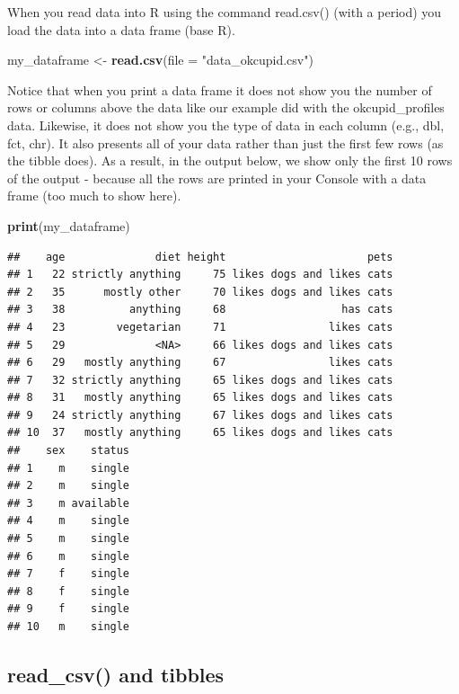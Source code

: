 \documentclass[
]{krantz}
\makeatletter
\newenvironment{Shaded}{\begin{snugshade}}{\end{snugshade}}
\newcommand{\DataTypeTok}[1]{\textcolor[rgb]{0.27,0.27,0.27}{#1}}
\newcommand{\KeywordTok}[1]{\textcolor[rgb]{0.27,0.27,0.27}{\textbf{#1}}}
\newcommand{\NormalTok}[1]{#1}
\newcommand{\StringTok}[1]{\textcolor[rgb]{0.5,0.5,0.5}{#1}}
\newenvironment{kframe}{%
\medskip{}
\setlength{\fboxsep}{.8em}
 \def\at@end@of@kframe{}%
 \ifinner\ifhmode%
  \def\at@end@of@kframe{\end{minipage}}%
  \begin{minipage}{\columnwidth}%
 \fi\fi%
 \def\FrameCommand##1{\hskip\@totalleftmargin \hskip-\fboxsep
 \colorbox{shadecolor}{##1}\hskip-\fboxsep
     \hskip-\linewidth \hskip-\@totalleftmargin \hskip\columnwidth}%
 \MakeFramed {\advance\hsize-\width
   \@totalleftmargin\z@ \linewidth\hsize
   \@setminipage}}%
 {\par\unskip\endMakeFramed%
 \at@end@of@kframe}
\renewenvironment{Shaded}{\begin{kframe}}{\end{kframe}}
\makeatother
\begin{document}
When you read data into R using the command read.csv() (with a period) you load the data into a data frame (base R).

\begin{Shaded}
\begin{Highlighting}[]
\NormalTok{my_dataframe <-}\StringTok{ }\KeywordTok{read.csv}\NormalTok{(}\DataTypeTok{file =} \StringTok{"data_okcupid.csv"}\NormalTok{)}
\end{Highlighting}
\end{Shaded}

Notice that when you print a data frame it does not show you the number of rows or columns above the data like our example did with the okcupid\_profiles data. Likewise, it does not show you the type of data in each column (e.g., dbl, fct, chr). It also presents all of your data rather than just the first few rows (as the tibble does). As a result, in the output below, we show only the first 10 rows of the output - because all the rows are printed in your Console with a data frame (too much to show here).

\begin{Shaded}
\begin{Highlighting}[]
\KeywordTok{print}\NormalTok{(my_dataframe)}
\end{Highlighting}
\end{Shaded}

\begin{verbatim}
##    age              diet height                      pets
## 1   22 strictly anything     75 likes dogs and likes cats
## 2   35      mostly other     70 likes dogs and likes cats
## 3   38          anything     68                  has cats
## 4   23        vegetarian     71                likes cats
## 5   29              <NA>     66 likes dogs and likes cats
## 6   29   mostly anything     67                likes cats
## 7   32 strictly anything     65 likes dogs and likes cats
## 8   31   mostly anything     65 likes dogs and likes cats
## 9   24 strictly anything     67 likes dogs and likes cats
## 10  37   mostly anything     65 likes dogs and likes cats
##    sex    status
## 1    m    single
## 2    m    single
## 3    m available
## 4    m    single
## 5    m    single
## 6    m    single
## 7    f    single
## 8    f    single
## 9    f    single
## 10   m    single
\end{verbatim}

\hypertarget{read_csv-and-tibbles}{%
\subsection{read\_csv() and tibbles}\label{read_csv-and-tibbles}}
\end{document}
